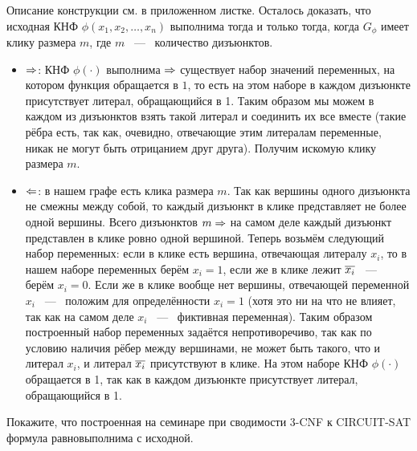 \documentclass[a4paper,12pt]{article}
\begin{document}
\begin{solution}
	
	Описание конструкции см. в приложенном листке. Осталось доказать, что исходная
	КНФ $\phi(x_1, x_2, \ldots, x_n)$ выполнима тогда и только тогда, когда $G_\phi$ имеет клику размера $m$, где $m$ ~---~ количество дизъюнктов.
	
	\begin{itemize}
		\item $\Rightarrow$: КНФ $\phi(\cdot)$ выполнима $\Rightarrow$ существует набор значений переменных, на котором функция обращается в $1$, то есть на этом наборе в каждом дизъюнкте присутствует литерал, обращающийся в 1. Таким образом мы можем в каждом из дизъюнктов взять такой литерал и соединить их все вместе (такие рёбра есть, так как, очевидно, отвечающие этим литералам переменные, никак не могут быть отрицанием друг друга). Получим искомую клику размера $m$.
		
		\item $\Leftarrow$: в нашем графе есть клика размера $m$. Так как вершины одного дизъюнкта не смежны между собой, то каждый дизъюнкт в клике представляет не более одной вершины. Всего дизъюнктов $m \Rightarrow$ на самом деле каждый дизъюнкт представлен в клике ровно одной вершиной. Теперь возьмём следующий набор переменных: если в клике есть вершина, отвечающая литералу $x_i$, то в нашем наборе переменных берём $x_i = 1$, если же в клике лежит $\overline{x_i}$ ~---~ берём $x_i = 0$. Если же в клике вообще нет вершины, отвечающей переменной $x_i$ ~---~ положим для определённости $x_i = 1$ (хотя это ни на что не влияет, так как на самом деле $x_i$ ~---~ фиктивная переменная). Таким образом построенный набор переменных задаётся непротиворечиво, так как по условию наличия рёбер между вершинами, не может быть такого, что и литерал $x_i$, и литерал $\overline{x_i}$ присутствуют в клике. На этом наборе КНФ $\phi(\cdot)$ обращается в 1, так как в каждом дизъюнкте присутствует литерал, обращающийся в 1.
	\end{itemize}
	
\end{solution}

\begin{tasknum}{7}
	Покажите, что построенная на семинаре при сводимости 3-CNF к CIRCUIT-SAT формула равновыполнима с исходной. 
\end{tasknum}
\end{document}

